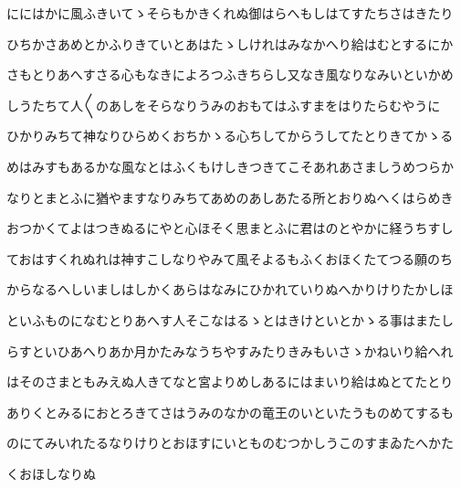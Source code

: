 \documentclass[a4paper,11pt,landscape]{ltjtarticle}
\begin{document}
ににはかに風ふきいてゝそらもかきくれぬ御はらへもしはてすたちさはきたり
\par\medskip
ひちかさあめとかふりきていとあはたゝしけれはみなかへり給はむとするにか
\par\medskip
さもとりあへすさる心もなきによろつふきちらし又なき風なりなみいといかめ
\par\medskip
しうたちて人〱のあしをそらなりうみのおもてはふすまをはりたらむやうに
\par\medskip
ひかりみちて神なりひらめくおちかゝる心ちしてからうしてたとりきてかゝる
\par\medskip
めはみすもあるかな風なとはふくもけしきつきてこそあれあさましうめつらか
\par\medskip
なりとまとふに猶やますなりみちてあめのあしあたる所とおりぬへくはらめき
\par\medskip
おつかくてよはつきぬるにやと心ほそく思まとふに君はのとやかに経うちすし
\par\medskip
ておはすくれぬれは神すこしなりやみて風そよるもふくおほくたてつる願のち
\par\medskip
からなるへしいましはしかくあらはなみにひかれていりぬへかりけりたかしほ
\par\medskip
といふものになむとりあへす人そこなはるゝとはきけといとかゝる事はまたし
\par\medskip
らすといひあへりあか月かたみなうちやすみたりきみもいさゝかねいり給へれ
\par\medskip
はそのさまともみえぬ人きてなと宮よりめしあるにはまいり給はぬとてたとり
\par\medskip
ありくとみるにおとろきてさはうみのなかの竜王のいといたうものめてするも
\par\medskip
のにてみいれたるなりけりとおほすにいとものむつかしうこのすまゐたへかた
\par\medskip
くおほしなりぬ
\par\medskip
\end{document}
